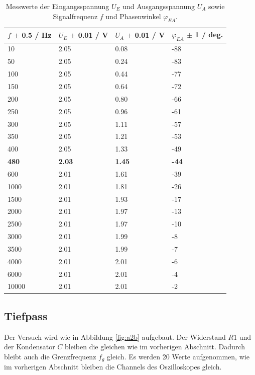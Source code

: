 \documentclass[12pt,a4paper,twoside]{article}
\begin{document}
\begin{table}[H]
    \centering
    \caption{Messwerte der Eingangsspannung $U_E$ und Ausgangsspannung $U_A$ sowie Signalfrequenz $f$ und Phasenwinkel $\varphi_{EA}$. }
    \label{tab:mess1}
    \begin{tabular}{| l | l | l | l |}
        \hline
        $f$ $\pm$ 0.5 / Hz   & $U_E$ $\pm$ 0.01 / V   & $U_A$ $\pm$ 0.01 / V  & $\varphi_{EA}$ $\pm$ 1 / deg. \\
        \hline
        10    & 2.05 & 0.08  & -88 \\
        50    & 2.05 & 0.24  & -83 \\
        100   & 2.05 & 0.44  & -77 \\
        150   & 2.05 & 0.64  & -72 \\
        200   & 2.05 & 0.80  & -66 \\
        250   & 2.05 & 0.96  & -61 \\
        300   & 2.05 & 1.11  & -57 \\
        350   & 2.05 & 1.21  & -53 \\
        400   & 2.05 & 1.33  & -49 \\
        \textbf{480} & \textbf{2.03} & \textbf{1.45}  & \textbf{-44} \\
        600   & 2.01 & 1.61  & -39 \\
        1000  & 2.01 & 1.81  & -26 \\
        1500  & 2.01 & 1.93  & -17 \\
        2000  & 2.01 & 1.97  & -13 \\
        2500  & 2.01 & 1.97  & -10 \\
        3000  & 2.01 & 1.99  & -8  \\
        3500  & 2.01 & 1.99  & -7  \\
        4000  & 2.01 & 2.01  & -6  \\
        6000  & 2.01 & 2.01  & -4  \\
        10000 & 2.01 & 2.01  & -2  \\
        \hline
    \end{tabular}
\end{table}

\subsection{Tiefpass}
Der Versuch wird wie in Abbildung \ref{fig:a2b} aufgebaut. 
Der Widerstand $R1$ und der Kondensator $C$ bleiben die gleichen wie im vorherigen Abschnitt. 
Dadurch bleibt auch die Grenzfrequenz $f_g$ gleich. 
Es werden 20 Werte aufgenommen, wie im vorherigen Abschnitt bleiben die Channels des Oszilloskopes gleich. 
\end{document}

